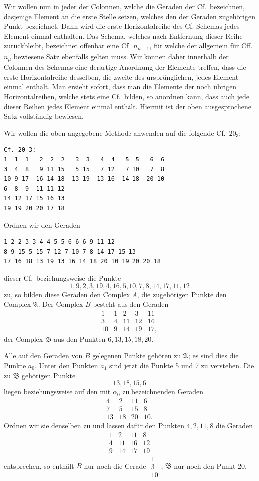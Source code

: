 \documentclass[11pt]{article}
\newcommand{\Cf}{\textup{Cf.}}
\begin{document}
Wir wollen nun in jeder der Colonnen, welche die Geraden der \Cf\ bezeichnen, dasjenige Element an die erste Stelle setzen, welches den der Geraden zugehörigen Punkt bezeichnet. Dann wird die erste Horizontalreihe des \Cf-Schemas jedes Element einmal enthalten. Das Schema, welches nach Entfernung dieser Reihe zurückbleibt, bezeichnet offenbar eine \Cf\ $n_{\mu-1}$, für welche der allgemein für Cff. $n_\mu$ bewiesene Satz ebenfalls gelten muss. Wir können daher innerhalb der Colonnen des Schemas eine derartige Anordnung der Elemente treffen, dass die erste Horizontalreihe desselben, die zweite des ursprünglichen, jedes Element einmal enthält. Man ersieht sofort, dass man die Elemente der noch übrigen Horizontalreihen, welche stets eine \Cf\ bilden, so anordnen kann, dass auch jede dieser Reihen jedes Element einmal enthält. Hiermit ist der oben ausgesprochene Satz vollständig bewiesen.

Wir wollen die oben angegebene Methode anwenden auf die folgende \Cf\ $20_3$:
\small
\begin{verbatim}
Cf. 20_3:
1  1  1   2  2  2   3  3   4  4   5  5   6  6
3  4  8   9 11 15   5 15   7 12   7 10   7  8
10 9 17  16 14 18  13 19  13 16  14 18  20 10
6  8  9  11 11 12
14 12 17 15 16 13
19 19 20 20 17 18
\end{verbatim}
\normalsize
Ordnen wir den Geraden
\small
\begin{verbatim}
1 2 2 3 3 4 4 5 5 6 6 6 9 11 12
8 9 15 5 15 7 12 7 10 7 8 14 17 15 13
17 16 18 13 19 13 16 14 18 20 10 19 20 20 18
\end{verbatim}
\normalsize
dieser \Cf\ beziehungsweise die Punkte
\[
1,9,2,3,19,4,16,5,10,7,8,14,17,11,12
\]
zu, so bilden diese Geraden den Complex $A$, die zugehörigen Punkte den Complex $\mathfrak A$. Der Complex $B$ besteht aus den Geraden
\[
\begin{array}{ccccc}
1&1&2&3&11\\
3&4&11&12&16\\
10&9&14&19&17,
\end{array}
\]
der Complex $\mathfrak B$ aus den Punkten $6,13,15,18,20$.

Alle auf den Geraden von $B$ gelegenen Punkte gehören zu $\mathfrak A$; es sind dies die Punkte $a_0$. Unter den Punkten $a_1$ sind jetzt die Punkte 5 und 7 zu verstehen. Die zu $\mathfrak B$ gehörigen Punkte
\[
13,18,15,6
\]
liegen beziehungsweise auf den mit $\alpha_0$ zu bezeichnenden Geraden
\[
\begin{array}{cccc}
4&2&11&6\\
7&5&15&8\\
13&18&20&10.
\end{array}
\]
Ordnen wir sie denselben zu und lassen dafür den Punkten $4,2,11,8$ die Geraden
\[
\begin{array}{cccc}
1&2&11&8\\
4&11&16&12\\
9&14&17&19
\end{array}
\]
entsprechen, so enthält $B$ nur noch die Gerade $\begin{array}{c}1\\3\\10\end{array}$, $\mathfrak B$ nur noch den Punkt 20.
\end{document}
